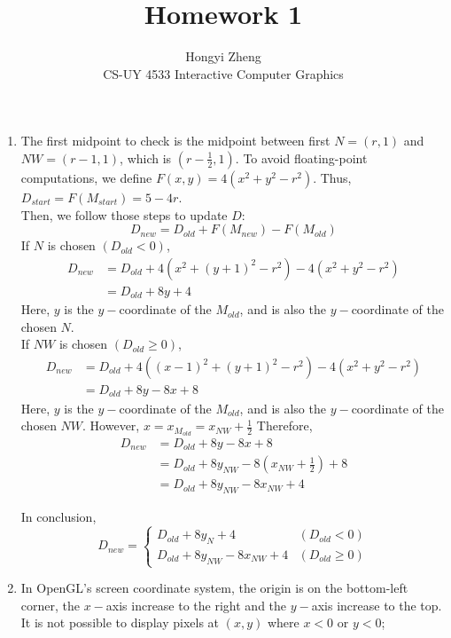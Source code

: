 \documentclass{article}
\title{Homework 1}
\author{%
    Hongyi Zheng
\\
CS-UY 4533 Interactive Computer Graphics
}
\theoremstyle{plain}
\begin{document}
\maketitle

\begin{enumerate}[label=\textbf{(\alph*)}]
\item
The first midpoint to check is the midpoint between first $N=(r, 1)$ and $NW = (r-1, 1)$, which is $(r - \frac{1}{2}, 1)$. To avoid floating-point computations, we define $F(x, y) = 4(x^2 + y^2 -r^2)$. Thus, $D_{start} = F(M_{start}) = 5- 4r$. \\

Then, we follow those steps to update $D$:
\begin{equation*}
    D_{new} = D_{old} + F(M_{new}) - F(M_{old})
\end{equation*}
If $N$ is chosen $(D_{old} < 0)$,
\begin{equation*}
\begin{aligned}
D_{new} &=D_{old}+4\left(x^{2}+(y+1)^{2}-r^{2}\right)-4\left(x^{2}+y^{2}-r^{2}\right) \\
&=D_{old} +8y+4
\end{aligned}
\end{equation*}
Here, $y$ is the $y-$coordinate of the $M_{old}$, and is also the $y-$coordinate of the chosen $N$. \\

If $NW$ is chosen $(D_{old} \geq 0)$,
\begin{equation*}
\begin{aligned}
D_{new} &=D_{old}+4\left((x-1)^{2}+(y+1)^{2}-r^{2}\right)-4\left(x^{2}+y^{2}-r^{2}\right) \\
&=D_{old} +8y - 8x + 8
\end{aligned}
\end{equation*}
Here, $y$ is the $y-$coordinate of the $M_{old}$, and is also the $y-$coordinate of the chosen $NW$. However, $x = x_{M_{old}} = x_{NW} + \frac{1}{2}$
Therefore,
\begin{equation*}
\begin{aligned}
D_{new} &=D_{old} +8y - 8x + 8 \\
&= D_{old} + 8y_{NW} - 8(x_{NW} + \frac{1}{2}) + 8 \\
&= D_{old} + 8y_{NW} - 8x_{NW} + 4
\end{aligned}
\end{equation*}

In conclusion,
\begin{equation*}
    D_{new} =
    \begin{cases}
        D_{old} + 8y_N + 4 & (D_{old} < 0) \\
        D_{old} + 8y_{NW} - 8x_{NW} + 4 & (D_{old} \geq 0)
    \end{cases}
\end{equation*}

\item
In OpenGL's screen coordinate system, the origin is on the bottom-left corner, the $x-$axis increase to the right and the $y-$axis increase to the top. It is not possible to display pixels at $(x, y)$ where $x < 0$ or $y < 0$;
\end{enumerate}
\end{document}
